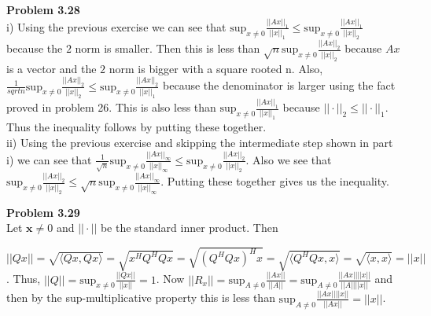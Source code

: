 \documentclass[letterpaper,12pt]{article}
\theoremstyle{definition}
\begin{document}
 \vspace{5mm}
 
 \noindent\textbf{Problem 3.28}\\
 i) Using the previous exercise we can see that $\mathrm{sup}_{x \neq 0} \frac{||Ax||_1}{||x||_1} \leq \mathrm{sup}_{x \neq 0} \frac{||Ax||_1}{||x||_2}$ because the $2$ norm is smaller.  Then this is less than  $\sqrt{n} \mathrm{sup}_{x \neq 0}\frac{||Ax||_2}{||x||_2}$ because $Ax$ is a vector and the $2$ norm is bigger with a square rooted n.  Also, $\frac{1}{sqrt{n}} \text{sup}_{x \neq 0} \frac{||Ax||_2}{||x||_2} \leq \text{sup}_{x \neq 0} \frac{||Ax||_2}{||x||_1}$ because the denominator is larger using the fact proved in problem 26.  This is also less than $\text{sup}_{x \neq 0} \frac{||Ax||_1}{||x||_1}$ because $||\cdot||_2 \leq ||\cdot||_1$.  Thus the inequality follows by putting these together.\\
 ii) Using the previous exercise and skipping the intermediate step shown in part i) we can see that $\frac{1}{\sqrt{n}}\mathrm{sup}_{x \neq 0} \frac{||Ax||_\infty}{||x||_\infty} \leq \mathrm{sup}_{x \neq 0} \frac{||Ax||_2}{||x||_2}$.  Also we see that $\mathrm{sup}_{x \neq 0} \frac{||Ax||_2}{||x||_2} \leq \sqrt{n} \mathrm{sup}_{x \neq 0} \frac{||Ax||_\infty}{||x||_\infty}$.  Putting these together gives us the inequality.\\ 
 \vspace{5mm}
 
 \noindent\textbf{Problem 3.29}\\
Let $\mathbf{x} \neq 0$ and $||\cdot||$ be the standard inner product.  Then \begin{center} $ ||Qx|| = \sqrt{\langle Qx, Qx \rangle} = \sqrt{x^HQ^HQx} = \sqrt{ (Q^HQx)^Hx} = \sqrt{\langle Q^HQx, x \rangle} = \sqrt{\langle x, x \rangle} = ||x||$.  Thus, $||Q|| = \mathrm{sup}_{x \neq 0} \frac{||Qx||}{||x||} = 1$.  Now $||R_x|| = \mathrm{sup}_{A \neq 0} \frac{||Ax||}{||A||}= \mathrm{sup}_{A \neq 0} \frac{||Ax||||x||}{||A||||x||}$ and then by the sup-multiplicative property this is less than $ \mathrm{sup}_{A \neq 0} \frac{||Ax||||x||}{||Ax||} = ||x||$.\end{center}
 \vspace{5mm}
 
\end{document}
